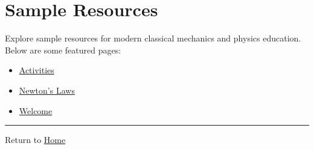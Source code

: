 \section{Sample Resources}\label{sample-resources}

Explore sample resources for modern classical mechanics and physics
education. Below are some featured pages:

\begin{itemize}
\tightlist
\item
  \href{activities.md}{Activities}
\item
  \href{newton.md}{Newton's Laws}
\item
  \href{welcome.md}{Welcome}
\end{itemize}

\begin{center}\rule{0.5\linewidth}{0.5pt}\end{center}

Return to \href{../home/index.md}{Home}
